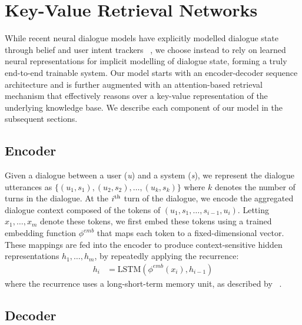 \documentclass[11pt,a4paper]{article}
\newcommand{\whethermath}[1]{\ifmmode{#1}\else{$#1$}\fi}
\newcommand{\uprm}[1]{\whethermath{^{\mbox{\scriptsize #1}}}}
\begin{document}
\section{Key-Value Retrieval Networks}
  While recent neural dialogue models have explicitly modelled dialogue state through belief and user intent trackers ~\cite{Wen:16,Dhingra:16,Henderson:14b}, we choose instead to rely on learned neural representations for implicit modelling of dialogue state, forming a truly end-to-end trainable system. Our model starts with an encoder-decoder sequence architecture and is further augmented with an attention-based retrieval mechanism that effectively reasons over a key-value representation of the underlying knowledge base. We describe each component of our model in the subsequent sections.


\subsection{Encoder}
  Given a dialogue between a user (\emph{u}) and a system (\emph{s}), we represent the dialogue utterances as $\{(u_1, s_1), (u_2, s_2), \ldots ,(u_k, s_k) \}$ where $k$ denotes the number of turns in the dialogue. At the $i\uprm{th}$ turn of the dialogue,
we encode the aggregated dialogue context composed of the tokens of $(u_1, s_1, \ldots, s_{i-1}, u_i)$. Letting $x_1, \ldots  , x_m$ denote these tokens,
we first embed these tokens using a trained embedding function $\phi^{emb}$ that maps each token to a fixed-dimensional vector. These mappings are fed into the encoder to produce context-sensitive hidden representations $h_1, \ldots , h_m$, by repeatedly applying the recurrence:
  \begin{align}
      h_i &= \textrm{LSTM}(\phi^{emb}(x_i), h_{i-1})
  \end{align}
  where the recurrence uses a long-short-term memory unit, as described by ~\cite{Hochreiter:97}.
 

\subsection{Decoder}
\end{document}
